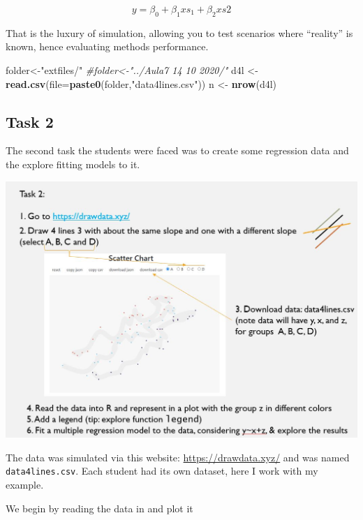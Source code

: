 \documentclass[
]{book}
\newenvironment{Shaded}{\begin{snugshade}}{\end{snugshade}}
\newcommand{\AttributeTok}[1]{\textcolor[rgb]{0.13,0.29,0.53}{#1}}
\newcommand{\CommentTok}[1]{\textcolor[rgb]{0.56,0.35,0.01}{\textit{#1}}}
\newcommand{\FunctionTok}[1]{\textcolor[rgb]{0.13,0.29,0.53}{\textbf{#1}}}
\newcommand{\NormalTok}[1]{#1}
\newcommand{\OtherTok}[1]{\textcolor[rgb]{0.56,0.35,0.01}{#1}}
\newcommand{\StringTok}[1]{\textcolor[rgb]{0.31,0.60,0.02}{#1}}
\begin{document}
\[y=\beta_0+\beta_1 xs_1+\beta_2 xs2\]

That is the luxury of simulation, allowing you to test scenarios where ``reality'' is known, hence evaluating methods performance.

\begin{Shaded}
\begin{Highlighting}[]
\NormalTok{folder}\OtherTok{\textless{}{-}}\StringTok{"extfiles/"}
\CommentTok{\#folder\textless{}{-}"../Aula7 14 10 2020/"}
\NormalTok{d4l }\OtherTok{\textless{}{-}} \FunctionTok{read.csv}\NormalTok{(}\AttributeTok{file=}\FunctionTok{paste0}\NormalTok{(folder,}\StringTok{"data4lines.csv"}\NormalTok{))}
\NormalTok{n }\OtherTok{\textless{}{-}} \FunctionTok{nrow}\NormalTok{(d4l)}
\end{Highlighting}
\end{Shaded}

\hypertarget{task-2}{%
\subsection{Task 2}\label{task-2}}

The second task the students were faced was to create some regression data and the explore fitting models to it.

\includegraphics{extfiles/Aula7Task7.JPG}

The data was simulated via this website: \url{https://drawdata.xyz/} and was named \texttt{data4lines.csv}. Each student had its own dataset, here I work with my example.

We begin by reading the data in and plot it
\end{document}
